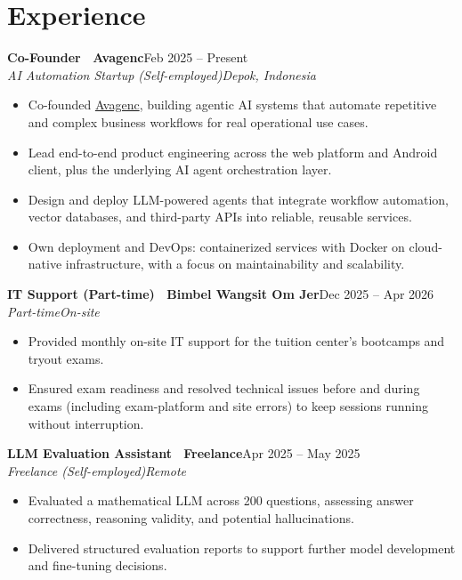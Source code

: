 \documentclass[a4paper,11pt]{article}
\newcommand{\entry}[4]{%
  \vspace{7pt}
  {\bfseries #1}\hfill{\normalsize #2}\\[2pt]
  {\itshape #3}\hfill{\itshape\small #4}\\[1pt]
}
\begin{document}
\section{Experience}

\entry{Co-Founder \textbar\ Avagenc}{Feb 2025 -- Present}{AI Automation Startup (Self-employed)}{Depok, Indonesia}
\begin{itemize}
  \item Co-founded \href{https://avagenc.com}{Avagenc}, building agentic AI systems that automate repetitive and complex business workflows for real operational use cases.
  \item Lead end-to-end product engineering across the web platform and Android client, plus the underlying AI agent orchestration layer.
  \item Design and deploy LLM-powered agents that integrate workflow automation, vector databases, and third-party APIs into reliable, reusable services.
  \item Own deployment and DevOps: containerized services with Docker on cloud-native infrastructure, with a focus on maintainability and scalability.
\end{itemize}

\entry{IT Support (Part-time) \textbar\ Bimbel Wangsit Om Jer}{Dec 2025 -- Apr 2026}{Part-time}{On-site}
\begin{itemize}
  \item Provided monthly on-site IT support for the tuition center's bootcamps and tryout exams.
  \item Ensured exam readiness and resolved technical issues before and during exams (including exam-platform and site errors) to keep sessions running without interruption.
\end{itemize}

\entry{LLM Evaluation Assistant \textbar\ Freelance}{Apr 2025 -- May 2025}{Freelance (Self-employed)}{Remote}
\begin{itemize}
  \item Evaluated a mathematical LLM across 200 questions, assessing answer correctness, reasoning validity, and potential hallucinations.
  \item Delivered structured evaluation reports to support further model development and fine-tuning decisions.
\end{itemize}
\end{document}
